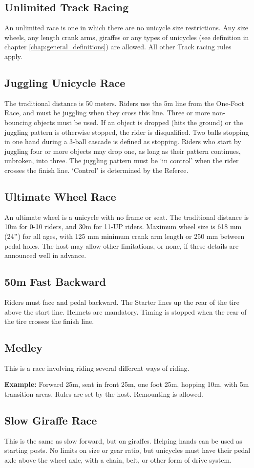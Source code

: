 \subsection{Unlimited Track Racing}
An unlimited race is one in which there are no unicycle size restrictions.
Any size wheels, any length crank arms, giraffes or any types of unicycles (see definition in chapter \ref{chap:general_definitions}) are allowed.
All other Track racing rules apply.

\subsection{Juggling Unicycle Race}
The traditional distance is 50 meters.
Riders use the 5m line from the One-Foot Race, and must be juggling when they cross this line.
Three or more non-bouncing objects must be used.
If an object is dropped (hits the ground) or the juggling pattern is otherwise stopped, the rider is disqualified.
Two balls stopping in one hand during a 3-ball cascade is defined as stopping.
Riders who start by juggling four or more objects may drop one, as long as their pattern continues, unbroken, into three.
The juggling pattern must be `in control' when the rider crosses the finish line.
`Control' is determined by the Referee.

\subsection{Ultimate Wheel Race}
An ultimate wheel is a unicycle with no frame or seat.
The traditional distance is 10m for 0-10 riders, and 30m for 11-UP riders.
Maximum wheel size is 618 mm (24$"$) for all ages, with 125 mm minimum crank arm length or 250 mm between pedal holes.
The host may allow other limitations, or none, if these details are announced well in advance.

\subsection{50m Fast Backward}
Riders must face and pedal backward.
The Starter lines up the rear of the tire above the start line.
Helmets are mandatory.
Timing is stopped when the rear of the tire crosses the finish line.

\subsection{Medley}
This is a race involving riding several different ways of riding.

\textbf{Example:} Forward 25m, seat in front 25m, one foot 25m, hopping 10m, with 5m transition areas.
Rules are set by the host.
Remounting is allowed.

\subsection{Slow Giraffe Race}
This is the same as slow forward, but on giraffes.
Helping hands can be used as starting posts.
No limits on size or gear ratio, but unicycles must have their pedal axle above the wheel axle, with a chain, belt, or other form of drive system.